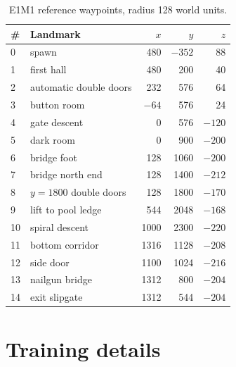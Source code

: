 \documentclass[11pt]{article}
\begin{document}
\begin{table}[ht]
\centering
\small
\begin{tabular}{llrrr}
\toprule
\# & Landmark & $x$ & $y$ & $z$ \\
\midrule
0 & spawn & 480 & $-352$ & 88 \\
1 & first hall & 480 & 200 & 40 \\
2 & automatic double doors & 232 & 576 & 64 \\
3 & button room & $-64$ & 576 & 24 \\
4 & gate descent & 0 & 576 & $-120$ \\
5 & dark room & 0 & 900 & $-200$ \\
6 & bridge foot & 128 & 1060 & $-200$ \\
7 & bridge north end & 128 & 1400 & $-212$ \\
8 & $y{=}1800$ double doors & 128 & 1800 & $-170$ \\
9 & lift to pool ledge & 544 & 2048 & $-168$ \\
10 & spiral descent & 1000 & 2300 & $-220$ \\
11 & bottom corridor & 1316 & 1128 & $-208$ \\
12 & side door & 1100 & 1024 & $-216$ \\
13 & nailgun bridge & 1312 & 800 & $-204$ \\
14 & exit slipgate & 1312 & 544 & $-204$ \\
\bottomrule
\end{tabular}
\caption{E1M1 reference waypoints, radius 128 world units.}
\label{tab:ladder}
\end{table}

\section{Training details}\label{app:training}
\end{document}

